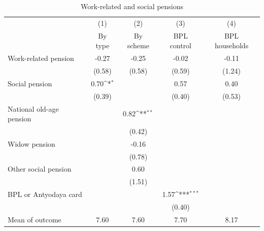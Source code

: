 \begin{table}[htbp]\centering
\def\sym#1{\ifmmode^{#1}\else\(^{#1}\)\fi}
\caption{Work-related and social pensions\label{tab:type}}
\begin{tabular}{l*{4}{c}}
\toprule
                    &\multicolumn{1}{c}{(1)}&\multicolumn{1}{c}{(2)}&\multicolumn{1}{c}{(3)}&\multicolumn{1}{c}{(4)}\\
                    &\multicolumn{1}{c}{By type}&\multicolumn{1}{c}{By scheme}&\multicolumn{1}{c}{BPL control}&\multicolumn{1}{c}{BPL households}\\
\midrule
Work-related pension&       -0.27         &       -0.25         &       -0.02         &       -0.11         \\
                    &      (0.58)         &      (0.58)         &      (0.59)         &      (1.24)         \\
\addlinespace
Social pension      &        0.70\sym{*}  &                     &        0.57         &        0.40         \\
                    &      (0.39)         &                     &      (0.40)         &      (0.53)         \\
\addlinespace
National old-age pension&                     &        0.82\sym{**} &                     &                     \\
                    &                     &      (0.42)         &                     &                     \\
\addlinespace
Widow pension       &                     &       -0.16         &                     &                     \\
                    &                     &      (0.78)         &                     &                     \\
\addlinespace
Other social pension&                     &        0.60         &                     &                     \\
                    &                     &      (1.51)         &                     &                     \\
\addlinespace
BPL or Antyodaya card&                     &                     &        1.57\sym{***}&                     \\
                    &                     &                     &      (0.40)         &                     \\
\midrule
Mean of outcome     &        7.60         &        7.60         &        7.70         &        8.17         \\

\end{tabular}
\end{table}
